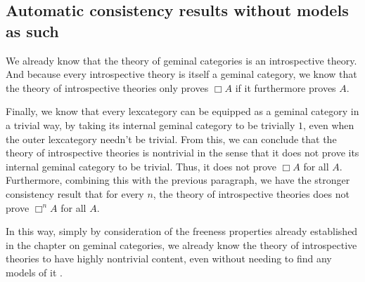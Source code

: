 



\subsection{Automatic consistency results without models as such}
We already know that the theory of geminal categories is an introspective theory. And because every introspective theory is itself a geminal category, we know that the theory of introspective theories only proves $\Box A$ if it furthermore proves $A$.

Finally, we know that every lexcategory can be equipped as a geminal category in a trivial way, by taking its internal geminal category to be trivially $1$, even when the outer lexcategory needn't be trivial. From this, we can conclude that the theory of introspective theories is nontrivial in the sense that it does not prove its internal geminal category to be trivial. Thus, it does not prove $\Box A$ for all $A$. Furthermore, combining this with the previous paragraph, we have the stronger consistency result that for every $n$, the theory of introspective theories does not prove $\Box^n A$ for all $A$.

In this way, simply by consideration of the freeness properties already established in the chapter on geminal categories, we already know the theory of introspective theories to have highly nontrivial content, even without needing to find any models of it .



